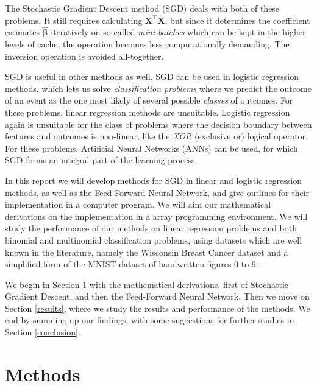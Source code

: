 \documentclass[]{article}
\begin{document}
The Stochastic Gradient Descent method (SGD) deals with both of these problems. It still requires calculating $\mathbf{X}^\intercal \mathbf{X}$, but since it determines the coefficient estimates $\mathbf{\hat{\beta}}$ iteratively on so-called \textit{mini batches} which can be kept in the higher levels of cache, the operation becomes less computationally demanding. The inversion operation is avoided all-together. 

SGD is useful in other methods as well. SGD can be used in logistic regression methods, which lets us solve \textit{classification problems} where we predict the outcome of an event as the one most likely of several possible \textit{classes} of outcomes. For these problems, linear regression methods are unsuitable. Logistic regression again is unsuitable for the class of problems where the decision boundary between features and outcomes is non-linear, like the \textit{XOR} (exclusive or) logical operator. For these problems, Artificial Neural Networks (ANNs) can be used, for which SGD forms an integral part of the learning process.

In this report we will develop methods for SGD in linear and logistic regression methods, as well as the Feed-Forward Neural Network, and give outlines for their implementation in a computer program. We will aim our mathematical derivations on the implementation in a array programming environment. We will study the performance of our methods on linear regression problems and both binomial and multinomial classification problems, using datasets which are well known in the literature, namely the Wisconsin Breast Cancer dataset and a simplified form of the MNIST dataset of handwritten figures 0 to 9 \cite{skl-datasets}.

We begin in Section \ref{methods} with the mathematical derivations, first of Stochastic Gradient Descent, and then the Feed-Forward Neural Network. Then we move on Section \ref{results}, where we study the results and performance of the methods. We end by summing up our findings, with some suggestions for further studies in Section \ref{conclusion}.

\clearpage
\section{Methods} \label{methods}
\end{document}

